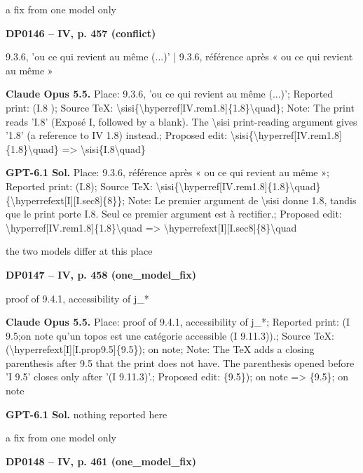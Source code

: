 a fix from one model only\par
\par\noindent\hypertarget{DP0146}{}\textbf{DP0146 -- IV, p. 457 (conflict)}\par
9.3.6, 'ou ce qui revient au même (...)' | 9.3.6, référence après « ou ce qui revient au même »\par
\textbf{Claude Opus 5.5.} Place: 9.3.6, 'ou ce qui revient au même (...)'; Reported print: (I.8    ); Source TeX: \textbackslash{}sisi\{\textbackslash{}hyperref[IV.rem1.8]\{1.8\}\textbackslash{}quad\}; Note: The print reads 'I.8' (Exposé I, followed by a blank). The \textbackslash{}sisi print-reading argument gives '1.8' (a reference to IV 1.8) instead.; Proposed edit: \textbackslash{}sisi\{\textbackslash{}hyperref[IV.rem1.8]\{1.8\}\textbackslash{}quad\} =\allowbreak > \textbackslash{}sisi\{I.8\textbackslash{}quad\}\par
\textbf{GPT-6.1 Sol.} Place: 9.3.6, référence après « ou ce qui revient au même »; Reported print: (I.8); Source TeX: \textbackslash{}sisi\{\textbackslash{}hyperref[IV.rem1.8]\{1.8\}\textbackslash{}quad\}\{\textbackslash{}hyperrefext[I][I.sec8]\{8\}\}; Note: Le premier argument de \textbackslash{}sisi donne 1.8, tandis que le print porte I.8. Seul ce premier argument est à rectifier.; Proposed edit: \textbackslash{}hyperref[IV.rem1.8]\{1.8\}\textbackslash{}quad =\allowbreak > \textbackslash{}hyperrefext[I][I.sec8]\{8\}\textbackslash{}quad\par
the two models differ at this place\par
\par\noindent\hypertarget{DP0147}{}\textbf{DP0147 -- IV, p. 458 (one\_model\_fix)}\par
proof of 9.4.1, accessibility of j\_*\par
\textbf{Claude Opus 5.5.} Place: proof of 9.4.1, accessibility of j\_*; Reported print: (I 9.5;on note qu'un topos est une catégorie accessible (I 9.11.3)).; Source TeX: (\textbackslash{}hyperrefext[I][I.prop9.5]\{9.5\}); on note; Note: The TeX adds a closing parenthesis after 9.5 that the print does not have. The parenthesis opened before 'I 9.5' closes only after '(I 9.11.3)'.; Proposed edit: \{9.5\}); on note =\allowbreak > \{9.5\}; on note\par
\textbf{GPT-6.1 Sol.} nothing reported here\par
a fix from one model only\par
\par\noindent\hypertarget{DP0148}{}\textbf{DP0148 -- IV, p. 461 (one\_model\_fix)}\par
